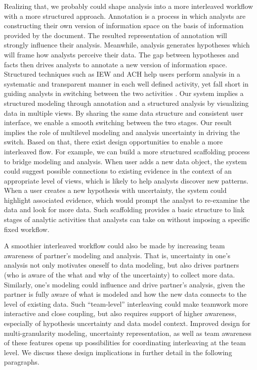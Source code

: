 Realizing that, we probably could shape analysis into a more interleaved
workflow with a more structured approach. Annotation is a process in which analysts are constructing their own version of information space on the basis of information provided by the document. The resulted representation of annotation will strongly influence their analysis. Meanwhile, analysis generates hypotheses which will frame how analysts perceive their data. The gap between hypotheses and facts then drives analysts to annotate a new version of information space. Structured techniques such as IEW and ACH help users
perform analysis in a systematic and transparent manner in each well defined activity, yet fall short in guiding analysts in switching between the two activities
\citep{Kang2011}. Our system implies a structured modeling through annotation and
a structured analysis by visualizing data in multiple views. By sharing the same
data structure and consistent user interface, we enable a smooth switching
between the two stages. Our result implies the role of multilevel modeling and
analysis uncertainty in driving the switch. Based on that, there exist design
opportunities to enable a more interleaved flow. For example, we can build a more structured scaffolding process to bridge modeling and analysis. When user adds a
new data object, the system could suggest possible connections to existing
evidence in the context of an appropriate level of views, which is likely to
help analysts discover new patterns. When a user creates a new hypothesis with
uncertainty, the system could highlight associated evidence, which would prompt
the analyst to re-examine the data and look for more data. Such scaffolding
provides a basic structure to link stages of analytic activities that analysts
can take on without imposing a specific fixed workflow.

A smoothier interleaved workflow could also be made by increasing team
awareness of partner's modeling and analysis. That is, uncertainty in one's
analysis not only motivates oneself to data modeling, but also drives partners
(who is aware of the what and why of the uncertainty) to collect more data.
Similarly, one's modeling could influence and drive partner's analysis, given
the partner is fully aware of what is modeled and how the new data connects to
the level of existing data. Such ``team-level'' interleaving could make teamwork
more interactive and close coupling, but also requires support of higher
awareness, especially of hypothesis uncertainty and data model context. Improved
design for multi-granularity modeling, uncertainty representation, as well as
team awareness of these features opens up possibilities for coordinating
interleaving at the team level. We discuss these design implications in further
detail in the following paragraphs.

